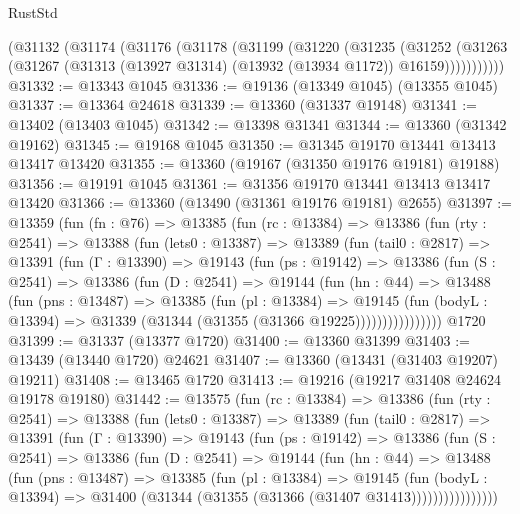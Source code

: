\begin{lexlean}{RustStd}
\begin{coremodule}
    (@31132
      (@31174
        (@31176
          (@31178
            (@31199
              (@31220
                (@31235
                  (@31252
                    (@31263
                      (@31267 (@31313 (@13927 @31314) (@13932 (@13934 @1172)) @16159)))))))))))
@31332 := @13343 @1045
@31336 := @19136 (@13349 @1045) (@13355 @1045)
@31337 := @13364 @24618
@31339 := @13360 (@31337 @19148)
@31341 := @13402 (@13403 @1045)
@31342 := @13398 @31341
@31344 := @13360 (@31342 @19162)
@31345 := @19168 @1045
@31350 := @31345 @19170 @13441 @13413 @13417 @13420
@31355 := @13360 (@19167 (@31350 @19176 @19181) @19188)
@31356 := @19191 @1045
@31361 := @31356 @19170 @13441 @13413 @13417 @13420
@31366 := @13360 (@13490 (@31361 @19176 @19181) @2655)
@31397 := @13359
    (fun (fn : @76) =>
    @13385
      (fun (rc : @13384) =>
      @13386
        (fun (rty : @2541) =>
        @13388
          (fun (lets0 : @13387) =>
          @13389
            (fun (tail0 : @2817) =>
            @13391
              (fun (Γ : @13390) =>
              @19143
                (fun (ps : @19142) =>
                @13386
                  (fun (S : @2541) =>
                  @13386
                    (fun (D : @2541) =>
                    @19144
                      (fun (hn : @44) =>
                      @13488
                        (fun (pns : @13487) =>
                        @13385
                          (fun (pl : @13384) =>
                          @19145
                            (fun (bodyL : @13394) =>
                            @31339 (@31344 (@31355 (@31366 @19225))))))))))))))))
    @1720
@31399 := @31337 (@13377 @1720)
@31400 := @13360 @31399
@31403 := @13439 (@13440 @1720) @24621
@31407 := @13360 (@13431 (@31403 @19207) @19211)
@31408 := @13465 @1720
@31413 := @19216 (@19217 @31408 @24624 @19178 @19180)
@31442 := @13575
    (fun (rc : @13384) =>
    @13386
      (fun (rty : @2541) =>
      @13388
        (fun (lets0 : @13387) =>
        @13389
          (fun (tail0 : @2817) =>
          @13391
            (fun (Γ : @13390) =>
            @19143
              (fun (ps : @19142) =>
              @13386
                (fun (S : @2541) =>
                @13386
                  (fun (D : @2541) =>
                  @19144
                    (fun (hn : @44) =>
                    @13488
                      (fun (pns : @13487) =>
                      @13385
                        (fun (pl : @13384) =>
                        @19145
                          (fun (bodyL : @13394) =>
                          @31400 (@31344 (@31355 (@31366 (@31407 @31413))))))))))))))))

\end{coremodule}
\end{lexlean}
